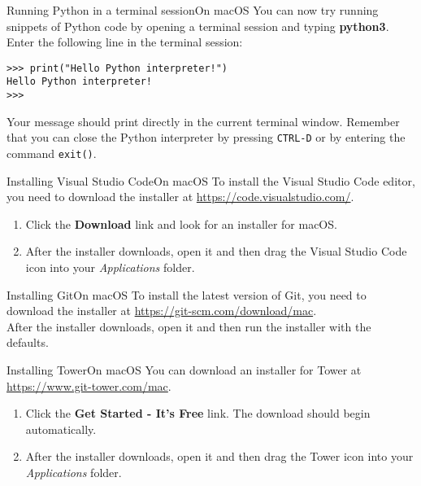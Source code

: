 \documentclass[aspectratio=169]{beamer}
\begin{document}
\begin{frame}[fragile]{Running Python in a terminal session}{On macOS}
    You can now try running snippets of Python code by opening a terminal session and typing \textbf{python3}.
    Enter the following line in the terminal session:\\
    \vspace{10pt}
    \begin{Verbatim}[fontsize=\footnotesize]
>>> print("Hello Python interpreter!")
Hello Python interpreter!
>>>
    \end{Verbatim}
    \vspace{10pt}
    Your message should print directly in the current terminal window.
    Remember that you can close the Python interpreter by pressing \texttt{CTRL-D} or by entering the command \texttt{exit()}.
\end{frame}


\begin{frame}[fragile]{Installing Visual Studio Code}{On macOS}
    To install the Visual Studio Code editor, you need to download the installer at \href{https://code.visualstudio.com/}{https://code.visualstudio.com/}.
    \vspace{10pt}
    \begin{enumerate}[label={\arabic*.},itemsep=5pt]
        \item Click the \textbf{Download} link and look for an installer for macOS.
        \item After the installer downloads, open it and then drag the Visual Studio Code icon into your \textit{Applications} folder.
    \end{enumerate}
\end{frame}


\begin{frame}{Installing Git}{On macOS}
    To install the latest version of Git, you need to download the installer at \href{https://git-scm.com/download/mac}{https://git-scm.com/download/mac}. \\
    \vspace{10pt}
    After the installer downloads, open it and then run the installer with the defaults.
\end{frame}


\begin{frame}[fragile]{Installing Tower}{On macOS}
    You can download an installer for Tower at \href{https://www.git-tower.com/mac}{https://www.git-tower.com/mac}.
    \vspace{10pt}
    \begin{enumerate}[label={\arabic*.},itemsep=5pt]
        \item Click the \textbf{Get Started - It's Free} link.
            The download should begin automatically.
        \item After the installer downloads, open it and then drag the Tower icon into your \textit{Applications} folder.
    \end{enumerate}
\end{frame}
\end{document}
